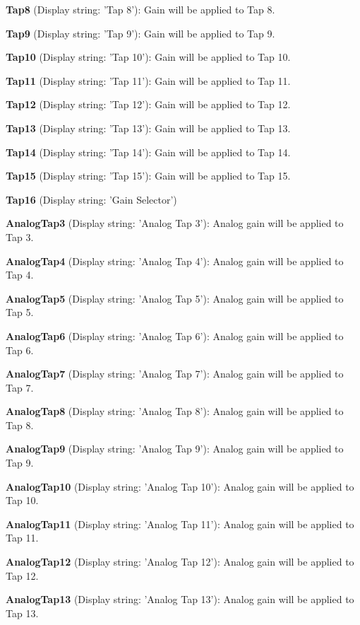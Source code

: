 \begin{DoxyItemize}
\item {\bfseries Tap8} (Display string\+: 'Tap 8')\+: Gain will be applied to Tap 8.
\item {\bfseries Tap9} (Display string\+: 'Tap 9')\+: Gain will be applied to Tap 9.
\item {\bfseries Tap10} (Display string\+: 'Tap 10')\+: Gain will be applied to Tap 10.
\item {\bfseries Tap11} (Display string\+: 'Tap 11')\+: Gain will be applied to Tap 11.
\item {\bfseries Tap12} (Display string\+: 'Tap 12')\+: Gain will be applied to Tap 12.
\item {\bfseries Tap13} (Display string\+: 'Tap 13')\+: Gain will be applied to Tap 13.
\item {\bfseries Tap14} (Display string\+: 'Tap 14')\+: Gain will be applied to Tap 14.
\item {\bfseries Tap15} (Display string\+: 'Tap 15')\+: Gain will be applied to Tap 15.
\item {\bfseries Tap16} (Display string\+: 'Gain Selector')
\item {\bfseries Analog\+Tap3} (Display string\+: 'Analog Tap 3')\+: Analog gain will be applied to Tap 3.
\item {\bfseries Analog\+Tap4} (Display string\+: 'Analog Tap 4')\+: Analog gain will be applied to Tap 4.
\item {\bfseries Analog\+Tap5} (Display string\+: 'Analog Tap 5')\+: Analog gain will be applied to Tap 5.
\item {\bfseries Analog\+Tap6} (Display string\+: 'Analog Tap 6')\+: Analog gain will be applied to Tap 6.
\item {\bfseries Analog\+Tap7} (Display string\+: 'Analog Tap 7')\+: Analog gain will be applied to Tap 7.
\item {\bfseries Analog\+Tap8} (Display string\+: 'Analog Tap 8')\+: Analog gain will be applied to Tap 8.
\item {\bfseries Analog\+Tap9} (Display string\+: 'Analog Tap 9')\+: Analog gain will be applied to Tap 9.
\item {\bfseries Analog\+Tap10} (Display string\+: 'Analog Tap 10')\+: Analog gain will be applied to Tap 10.
\item {\bfseries Analog\+Tap11} (Display string\+: 'Analog Tap 11')\+: Analog gain will be applied to Tap 11.
\item {\bfseries Analog\+Tap12} (Display string\+: 'Analog Tap 12')\+: Analog gain will be applied to Tap 12.
\item {\bfseries Analog\+Tap13} (Display string\+: 'Analog Tap 13')\+: Analog gain will be applied to Tap 13.

\end{DoxyItemize}
